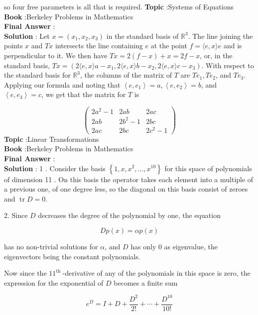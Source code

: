 \documentclass[10pt]{article}
\begin{document}
so four free parameters is all that is required.
\textbf{Topic} :Systems of Equations \\
\textbf{Book} :Berkeley Problems in Mathematics\\
\textbf{Final Answer} :\\


\textbf{Solution} : Let $x=\left(x_{1}, x_{2}, x_{3}\right)$ in the standard basis of $\mathbb{R}^{3}$. The line joining the points $x$ and $T x$ intersects the line containing $e$ at the point $f=\langle e, x\rangle e$ and is perpendicular to it. We then have $T x=2(f-x)+x=2 f-x$, or, in the standard basis, $T x=\left(2\langle e, x\rangle a-x_{1}, 2\langle e, x\rangle b-x_{2}, 2\langle e, x\rangle c-x_{3}\right)$. With respect to the standard basis for $\mathbb{R}^{3}$, the columns of the matrix of $T$ are $T e_{1}, T e_{2}$, and $T e_{3}$. Applying our formula and noting that $\left\langle e, e_{1}\right\rangle=a,\left\langle e, e_{2}\right\rangle=b$, and $\left\langle e, e_{3}\right\rangle=c$, we get that the matrix for $T$ is

$$
\left(\begin{array}{ccc}
2 a^{2}-1 & 2 a b & 2 a c \\
2 a b & 2 b^{2}-1 & 2 b c \\
2 a c & 2 b c & 2 c^{2}-1
\end{array}\right)
$$
\textbf{Topic} :Linear Transformations \\
\textbf{Book} :Berkeley Problems in Mathematics\\
\textbf{Final Answer} :\\


\textbf{Solution} : 1 . Consider the basis $\left\{1, x, x^{2}, \ldots, x^{10}\right\}$ for this space of polynomials of dimension 11 . On this basis the operator takes each element into a multiple of a previous one, of one degree less, so the diagonal on this basis consist of zeroes and $\operatorname{tr} D=0$.

2. Since $D$ decreases the degree of the polynomial by one, the equation

$$
D p(x)=\alpha p(x)
$$

has no non-trivial solutions for $\alpha$, and $D$ has only 0 as eigenvalue, the eigenvectors being the constant polynomials.

Now since the $11^{\text {th }}$-derivative of any of the polynomials in this space is zero, the expression for the exponential of $D$ becomes a finite sum

$$
e^{D}=I+D+\frac{D^{2}}{2 !}+\cdots+\frac{D^{10}}{10 !}
$$
\end{document}
